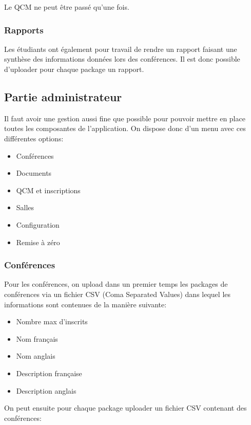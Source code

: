 Le QCM ne peut être passé qu'une fois.

            \subsubsection{Rapports}

Les étudiants ont également pour travail de rendre un rapport faisant une synthèse des informations données lors des conférences.
Il est donc possible d'uploader pour chaque package un rapport.

        \subsection{Partie administrateur}

Il faut avoir une gestion aussi fine que possible pour pouvoir mettre en place toutes les composantes de l'application.
On dispose donc d'un menu avec ces différentes options:

    \begin{itemize}
    \item Conférences
    \item Documents
    \item QCM et inscriptions
    \item Salles
    \item Configuration
    \item Remise à zéro
    \end{itemize}

            \subsubsection{Conférences}

Pour les conférences, on upload dans un premier temps les packages de conférences via un fichier CSV (Coma Separated Values)
dans lequel les informations sont contenues de la manière suivante:

    \begin{itemize}
    \item Nombre max d'inscrits
    \item Nom français
    \item Nom anglais
    \item Description française
    \item Description anglais
    \end{itemize}

On peut ensuite pour chaque package uploader un fichier CSV contenant des conférences:

